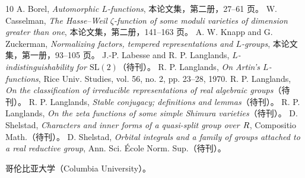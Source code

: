 \begin{thebibliography}{10}
 A. Borel, \textit{Automorphic $L$-functions}, 本论文集，第二册，27--61 页。
 W. Casselman, \textit{The Hasse--Weil $\zeta$-function of some moduli varieties of dimension greater than one}, 本论文集，第二册，141--163 页。
 A. W. Knapp and G. Zuckerman, \textit{Normalizing factors, tempered representations and $L$-groups}, 本论文集，第一册，93--105 页。
 J.-P. Labesse and R. P. Langlands, \textit{$L$-indistinguishability for $\mathrm{SL}(2)$}（待刊）。
 R. P. Langlands, \textit{On Artin's $L$-functions}, Rice Univ. Studies, vol. 56, no. 2, pp. 23--28, 1970.
 R. P. Langlands, \textit{On the classification of irreducible representations of real algebraic groups}（待刊）。
 R. P. Langlands, \textit{Stable conjugacy; definitions and lemmas}（待刊）。
 R. P. Langlands, \textit{On the zeta functions of some simple Shimura varieties}（待刊）。
 D. Shelstad, \textit{Characters and inner forms of a quasi-split group over $R$}, Compositio Math.（待刊）。
 D. Shelstad, \textit{Orbital integrals and a family of groups attached to a real reductive group}, Ann. Sci. École Norm. Sup.（待刊）。
\end{thebibliography}
\noindent 哥伦比亚大学（Columbia University）。
